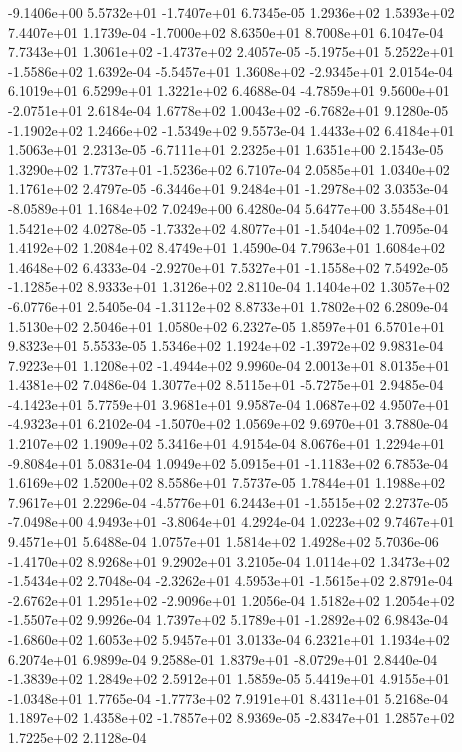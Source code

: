 -9.1406e+00  5.5732e+01 -1.7407e+01  6.7345e-05
1.2936e+02 1.5393e+02 7.4407e+01  1.1739e-04
-1.7000e+02  8.6350e+01  8.7008e+01  6.1047e-04
 7.7343e+01  1.3061e+02 -1.4737e+02  2.4057e-05
-5.1975e+01  5.2522e+01 -1.5586e+02  1.6392e-04
-5.5457e+01  1.3608e+02 -2.9345e+01  2.0154e-04
6.1019e+01 6.5299e+01 1.3221e+02  6.4688e-04
-4.7859e+01  9.5600e+01 -2.0751e+01  2.6184e-04
 1.6778e+02  1.0043e+02 -6.7682e+01  9.1280e-05
-1.1902e+02  1.2466e+02 -1.5349e+02  9.5573e-04
1.4433e+02 6.4184e+01 1.5063e+01  2.2313e-05
-6.7111e+01  2.2325e+01  1.6351e+00  2.1543e-05
 1.3290e+02  1.7737e+01 -1.5236e+02  6.7107e-04
2.0585e+01 1.0340e+02 1.1761e+02  2.4797e-05
-6.3446e+01  9.2484e+01 -1.2978e+02  3.0353e-04
-8.0589e+01  1.1684e+02  7.0249e+00  6.4280e-04
5.6477e+00 3.5548e+01 1.5421e+02  4.0278e-05
-1.7332e+02  4.8077e+01 -1.5404e+02  1.7095e-04
1.4192e+02 1.2084e+02 8.4749e+01  1.4590e-04
7.7963e+01 1.6084e+02 1.4648e+02  6.4333e-04
-2.9270e+01  7.5327e+01 -1.1558e+02  7.5492e-05
-1.1285e+02  8.9333e+01  1.3126e+02  2.8110e-04
 1.1404e+02  1.3057e+02 -6.0776e+01  2.5405e-04
-1.3112e+02  8.8733e+01  1.7802e+02  6.2809e-04
1.5130e+02 2.5046e+01 1.0580e+02  6.2327e-05
1.8597e+01 6.5701e+01 9.8323e+01  5.5533e-05
 1.5346e+02  1.1924e+02 -1.3972e+02  9.9831e-04
 7.9223e+01  1.1208e+02 -1.4944e+02  9.9960e-04
2.0013e+01 8.0135e+01 1.4381e+02  7.0486e-04
 1.3077e+02  8.5115e+01 -5.7275e+01  2.9485e-04
-4.1423e+01  5.7759e+01  3.9681e+01  9.9587e-04
 1.0687e+02  4.9507e+01 -4.9323e+01  6.2102e-04
-1.5070e+02  1.0569e+02  9.6970e+01  3.7880e-04
1.2107e+02 1.1909e+02 5.3416e+01  4.9154e-04
 8.0676e+01  1.2294e+01 -9.8084e+01  5.0831e-04
 1.0949e+02  5.0915e+01 -1.1183e+02  6.7853e-04
1.6169e+02 1.5200e+02 8.5586e+01  7.5737e-05
1.7844e+01 1.1988e+02 7.9617e+01  2.2296e-04
-4.5776e+01  6.2443e+01 -1.5515e+02  2.2737e-05
-7.0498e+00  4.9493e+01 -3.8064e+01  4.2924e-04
1.0223e+02 9.7467e+01 9.4571e+01  5.6488e-04
1.0757e+01 1.5814e+02 1.4928e+02  5.7036e-06
-1.4170e+02  8.9268e+01  9.2902e+01  3.2105e-04
 1.0114e+02  1.3473e+02 -1.5434e+02  2.7048e-04
-2.3262e+01  4.5953e+01 -1.5615e+02  2.8791e-04
-2.6762e+01  1.2951e+02 -2.9096e+01  1.2056e-04
 1.5182e+02  1.2054e+02 -1.5507e+02  9.9926e-04
 1.7397e+02  5.1789e+01 -1.2892e+02  6.9843e-04
-1.6860e+02  1.6053e+02  5.9457e+01  3.0133e-04
6.2321e+01 1.1934e+02 6.2074e+01  6.9899e-04
 9.2588e-01  1.8379e+01 -8.0729e+01  2.8440e-04
-1.3839e+02  1.2849e+02  2.5912e+01  1.5859e-05
 5.4419e+01  4.9155e+01 -1.0348e+01  1.7765e-04
-1.7773e+02  7.9191e+01  8.4311e+01  5.2168e-04
 1.1897e+02  1.4358e+02 -1.7857e+02  8.9369e-05
-2.8347e+01  1.2857e+02  1.7225e+02  2.1128e-04
